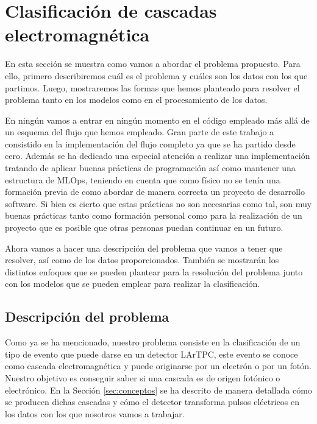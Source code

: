 \documentclass[a4paper,12pt,twoside,titlepage]{article}
\newcommand{\red}[1]{\textcolor{red}{#1}}
\begin{document}
\section{Clasificación de cascadas electromagnética}


En esta sección se muestra como vamos a abordar el problema propuesto. Para ello, primero describiremos cuál es el problema y cuáles son los datos con los que partimos. Luego, mostraremos las formas que hemos planteado para resolver el problema tanto en los modelos como en el procesamiento de los datos.

En ningún vamos a entrar en ningún momento en el código empleado más allá de un esquema del flujo que hemos empleado. Gran parte de este trabajo a consistido en la implementación del flujo completo ya que se ha partido desde cero. Además se ha dedicado una especial atención a realizar una implementación tratando de aplicar buenas prácticas de programación \cite{clean} así como mantener una estructura de MLOps, teniendo en cuenta que como físico no se tenía una formación previa de como abordar de manera correcta un proyecto de desarrollo software. Si bien es cierto que estas prácticas no son necesarias como tal, son muy buenas prácticas tanto como formación personal como para la realización de un proyecto que es posible que otras personas puedan continuar en un futuro.

Ahora vamos a hacer una descripción del problema que vamos a tener que resolver, así como de los datos proporcionados. También se mostrarán los distintos enfoques que se pueden plantear para la resolución del problema junto con los modelos que se pueden emplear para realizar la clasificación.
\subsection{Descripción del problema}

Como ya se ha mencionado, nuestro problema consiste en la clasificación de un tipo de evento que puede darse en un detector LArTPC, este evento se conoce como cascada electromagnética y puede originarse por un electrón o por un fotón. Nuestro objetivo es conseguir saber si una cascada es de origen fotónico o electrónico. En la Sección \ref{sec:conceptos} se ha descrito de manera detallada cómo se producen dichas cascadas y cómo el detector transforma pulsos eléctricos en los datos con los que nosotros vamos a trabajar.
\end{document}
